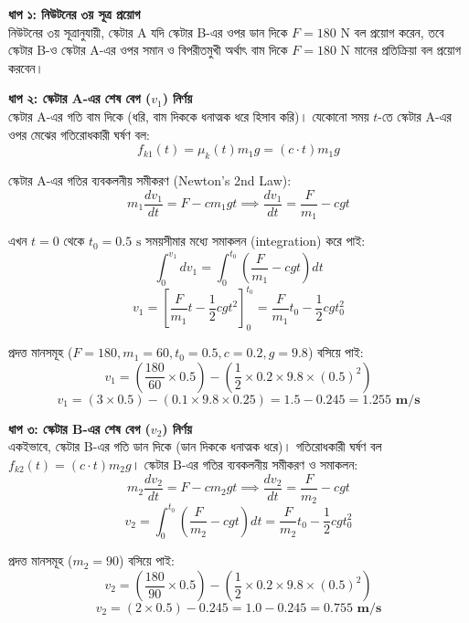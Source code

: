 \documentclass[12pt, a4paper]{article}
\begin{document}
\begin{tcolorbox}[solutionbox={সমাধান (Solution)}]
\noindent
\textbf{ধাপ ১: নিউটনের ৩য় সূত্র প্রয়োগ} \\
নিউটনের ৩য় সূত্রানুযায়ী, স্কেটার A যদি স্কেটার B-এর ওপর ডান দিকে $F = 180\text{ N}$ বল প্রয়োগ করেন, তবে স্কেটার B-ও স্কেটার A-এর ওপর সমান ও বিপরীতমুখী অর্থাৎ বাম দিকে $F = 180\text{ N}$ মানের প্রতিক্রিয়া বল প্রয়োগ করবেন।

\vspace{0.5em}
\noindent
\textbf{ধাপ ২: স্কেটার A-এর শেষ বেগ ($v_1$) নির্ণয়} \\
স্কেটার A-এর গতি বাম দিকে (ধরি, বাম দিককে ধনাত্মক ধরে হিসাব করি)। যেকোনো সময় $t$-তে স্কেটার A-এর ওপর মেঝের গতিরোধকারী ঘর্ষণ বল:
$$f_{k1}(t) = \mu_k(t) m_1 g = (c \cdot t) m_1 g$$

স্কেটার A-এর গতির ব্যবকলনীয় সমীকরণ (Newton's 2nd Law):
$$m_1 \frac{dv_1}{dt} = F - c m_1 g t \implies \frac{dv_1}{dt} = \frac{F}{m_1} - c g t$$

এখন $t = 0$ থেকে $t_0 = 0.5\text{ s}$ সময়সীমার মধ্যে সমাকলন (integration) করে পাই:
$$\int_0^{v_1} dv_1 = \int_0^{t_0} \left( \frac{F}{m_1} - c g t \right) dt$$ 
$$v_1 = \left[ \frac{F}{m_1} t - \frac{1}{2} c g t^2 \right]_0^{t_0} = \frac{F}{m_1} t_0 - \frac{1}{2} c g t_0^2$$

প্রদত্ত মানসমূহ ($F=180, m_1=60, t_0=0.5, c=0.2, g=9.8$) বসিয়ে পাই:
$$v_1 = \left( \frac{180}{60} \times 0.5 \right) - \left( \frac{1}{2} \times 0.2 \times 9.8 \times (0.5)^2 \right)$$ 
$$v_1 = (3 \times 0.5) - (0.1 \times 9.8 \times 0.25) = 1.5 - 0.245 = \mathbf{1.255\text{ m/s}}$$

\vspace{0.5em}
\noindent
\textbf{ধাপ ৩: স্কেটার B-এর শেষ বেগ ($v_2$) নির্ণয়} \\
একইভাবে, স্কেটার B-এর গতি ডান দিকে (ডান দিককে ধনাত্মক ধরে)। গতিরোধকারী ঘর্ষণ বল $f_{k2}(t) = (c \cdot t) m_2 g$। 
স্কেটার B-এর গতির ব্যবকলনীয় সমীকরণ ও সমাকলন:
$$m_2 \frac{dv_2}{dt} = F - c m_2 g t \implies \frac{dv_2}{dt} = \frac{F}{m_2} - c g t$$
$$v_2 = \int_0^{t_0} \left( \frac{F}{m_2} - c g t \right) dt = \frac{F}{m_2} t_0 - \frac{1}{2} c g t_0^2$$

প্রদত্ত মানসমূহ ($m_2=90$) বসিয়ে পাই:
$$v_2 = \left( \frac{180}{90} \times 0.5 \right) - \left( \frac{1}{2} \times 0.2 \times 9.8 \times (0.5)^2 \right)$$ 
$$v_2 = (2 \times 0.5) - 0.245 = 1.0 - 0.245 = \mathbf{0.755\text{ m/s}}$$


\end{tcolorbox}
\end{document}
